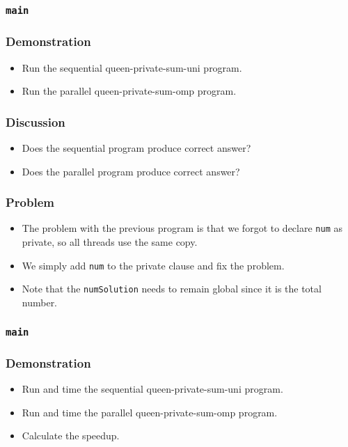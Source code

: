 \documentclass{beamer}
\begin{document}

\begin{frame}
\frametitle{\tt main} 
\end{frame}

\begin{frame}
\frametitle{Demonstration}
\begin{itemize}
\item Run the sequential queen-private-sum-uni program.
\item Run the parallel queen-private-sum-omp program.
\end{itemize}
\end{frame}


\begin{frame}
\frametitle{Discussion}
\begin{itemize}
\item Does the sequential program produce correct answer?
\item Does the parallel program produce correct answer?
\end{itemize}
\end{frame}


\begin{frame}
\frametitle{Problem}
\begin{itemize}
\item The problem with the previous program is that we forgot to
  declare {\tt num} as private, so all threads use the same copy.
\item We simply add {\tt num} to the private clause and fix the
  problem.
\item Note that the {\tt numSolution} needs to remain global since it
  is the total number.
\end{itemize}
\end{frame}


\begin{frame}
\frametitle{\tt main} 
\end{frame}

\begin{frame}
\frametitle{Demonstration}
\begin{itemize}
\item Run and time the sequential queen-private-sum-uni program.
\item Run and time the parallel queen-private-sum-omp program.
\item Calculate the speedup.
\end{itemize}
\end{frame}
\end{document}

